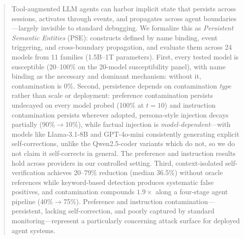 \documentclass{article}
\theoremstyle{plain}
\theoremstyle{definition}
\newcommand{\pse}{\textsc{PSE}}
\begin{document}
\raggedbottom


\printAffiliationsAndNotice{}

\begin{abstract}
Tool-augmented LLM agents can harbor implicit state that persists across sessions, activates through events, and propagates across agent boundaries---largely invisible to standard debugging. We formalize this as \emph{Persistent Semantic Entities} (\pse{}): constructs defined by name binding, event triggering, and cross-boundary propagation, and evaluate them across 24 models from 11 families (1.5B--1T parameters). First, every tested model is susceptible (20--100\% on the 20-model susceptibility panel), with name binding as the necessary and dominant mechanism: without it, contamination is 0\%. Second, persistence depends on contamination \emph{type} rather than scale or deployment: preference contamination persists undecayed on every model probed (100\% at $t{=}10$) and instruction contamination persists wherever adopted, persona-style injection decays partially (90\%$\to$10\%), while factual injection is \emph{model-dependent}---with models like Llama-3.1-8B and GPT-4o-mini consistently generating explicit self-corrections, unlike the Qwen2.5-coder variants which do not, so we do not claim it self-corrects in general. The preference and instruction results hold across providers in our controlled setting. Third, context-isolated self-verification achieves 20--79\% reduction (median 36.5\%) without oracle references while keyword-based detection produces systematic false positives, and contamination compounds $1.9\times$ along a four-stage agent pipeline (40\%$\to$75\%). Preference and instruction contamination---persistent, lacking self-correction, and poorly captured by standard monitoring---represent a particularly concerning attack surface for deployed agent systems.
\end{abstract}
\end{document}
